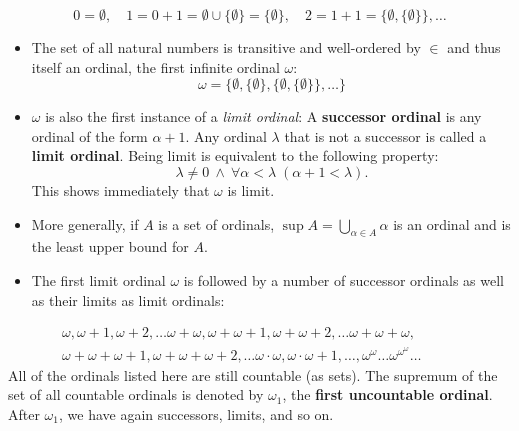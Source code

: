 \documentclass{article}
\begin{document}
\begin{equation}
0 = \emptyset, \quad 1 = 0 + 1 = \emptyset \cup \{\emptyset\} = \{\emptyset\}, \quad 2 = 1+1 = \{\emptyset, \{\emptyset\} \}, \dots
\end{equation}

\begin{itemize}
\item The set of all natural numbers is transitive and well-ordered by $\in$ and thus itself an ordinal, the first infinite ordinal $\omega$:
\begin{equation}

  \omega = \{\emptyset, \{\emptyset\}, \{\emptyset, \{\emptyset\}\}, \dots \}
\end{equation}


\item $\omega$ is also the first instance of a \textit{limit ordinal}: A \textbf{successor ordinal} is any ordinal of the form $\alpha+1$. Any ordinal $\lambda$ that is not a successor is called a \textbf{limit ordinal}. Being limit is equivalent to the following property:
\begin{equation}

\lambda \neq 0 \: \wedge \: \forall \alpha < \lambda \; (\alpha+1 < \lambda).
\end{equation}
This shows immediately that $\omega$ is limit.


\item More generally, if $A$ is a set of ordinals, $\sup A = \bigcup_{\alpha \in A} \alpha$ is an ordinal and is the least upper bound for $A$.


\item The first limit ordinal $\omega$ is followed by a number of successor ordinals as well as their limits as limit ordinals:
\end{itemize}
\begin{gather*}
\omega, \omega+1, \omega+2, \ldots \omega+\omega, \omega+\omega+1, \omega + \omega+2, \ldots \omega+\omega+ \omega, \qquad \quad \\ \omega + \omega+ \omega+1, \omega + \omega+ \omega+2, \ldots  \omega \cdot \omega,  \omega \cdot \omega +1,\ldots, \omega^{\omega} \ldots \omega^{\omega^{\omega}} \ldots
\end{gather*}
All of the ordinals listed here are still countable (as sets). The supremum of the set of all countable ordinals is denoted by $\omega_1$, the \textbf{first uncountable ordinal}. After $\omega_1$, we have again successors, limits, and so on.
\end{document}
